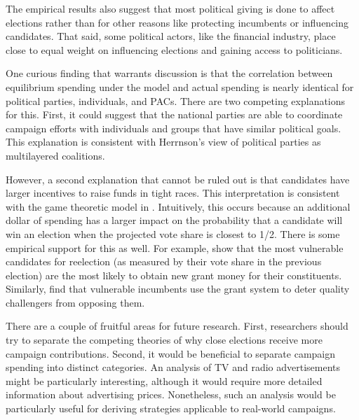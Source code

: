 \documentclass[12pt,final,fleqn]{article}
\theoremstyle{plain}
\begin{document}
The empirical results also suggest that most political giving is done to affect elections rather than for other reasons like protecting incumbents or influencing candidates. That said, some political actors, like the financial industry, place close to equal weight on influencing elections and gaining access to politicians.

One curious finding that warrants discussion is that the correlation between equilibrium spending under the model and actual spending is nearly identical for political parties, individuals, and PACs. There are two competing explanations for this. First, it could suggest that the national parties are able to coordinate campaign efforts with individuals and groups that have similar political goals. This explanation is consistent with Herrnson's \citeyear{herrnson2009roles} view of political parties as multilayered coalitions.

However, a second explanation that cannot be ruled out is that candidates have larger incentives to raise funds in tight races. This interpretation is consistent with the game theoretic model in \citet{erikson2000equilibria}. Intuitively, this occurs because an additional dollar of spending has a larger impact on the probability that a candidate will win an election when the projected vote share is closest to 1/2. There is some empirical support for this as well. For example, \citet{stein1994congressional} show that the most vulnerable candidates for reelection (as measured by their vote share in the previous election) are the most likely to obtain new grant money for their constituents. Similarly, \citet{bickers1996electoral} find that vulnerable incumbents use the grant system to deter quality challengers from opposing them.

There are a couple of fruitful areas for future research. First, researchers should try to separate the competing theories of why close elections receive more campaign contributions. Second, it would be beneficial to separate campaign spending into distinct categories. An analysis of TV and radio advertisements might be particularly interesting, although it would require more detailed information about advertising prices. Nonetheless, such an analysis would be particularly useful for deriving strategies applicable to real-world campaigns.
 

\end{document}
